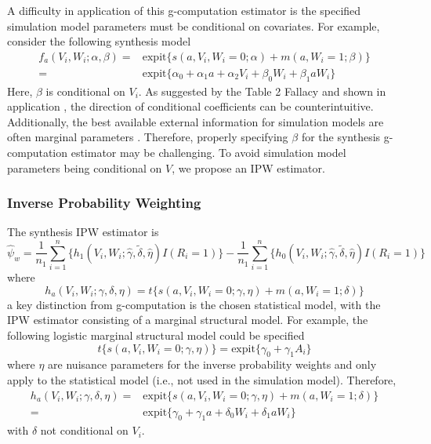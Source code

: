 \documentclass[]{article}
\begin{document}
A difficulty in application of this g-computation estimator is the specified simulation model parameters must be conditional on covariates. For example, consider the following synthesis model
\begin{equation*}
	\begin{aligned}
		f_a(V_i, W_i; \alpha, \beta) = & \text{expit}\{s(a,V_i, W_i=0;\alpha) + m(a,W_i=1;\beta)\} \\
		= & \text{expit}\{\alpha_0 + \alpha_1 a + \alpha_2 V_i + \beta_0 W_i + \beta_1 a W_i\}
	\end{aligned}
\end{equation*}
Here, $\beta$ is conditional on $V_i$. As suggested by the Table 2 Fallacy and shown in application \cite{westreich_table_2013, bandoli_revisiting_2018, williamson_factors_2020, westreich_comment_2021, keller_rates_2018}, the direction of conditional coefficients can be counterintuitive. Additionally, the best available external information for simulation models are often marginal parameters \cite{murray_comparison_2017, murray_challenges_2020}. Therefore, properly specifying $\beta$ for the synthesis g-computation estimator may be challenging. To avoid simulation model parameters being conditional on $V$, we propose an IPW estimator.

\subsubsection*{Inverse Probability Weighting}

The synthesis IPW estimator is
\[\hat{\psi}_w = \frac{1}{n_1} \sum_{i=1}^{n} 
\{h_1(V_i,W_i;\hat{\gamma}, \tilde{\delta}, \hat{\eta}) I(R_i = 1)\} - 
\frac{1}{n_1} \sum_{i=1}^{n} \{h_0(V_i,W_i;\hat{\gamma}, \tilde{\delta}, \hat{\eta}) I(R_i = 1)\}\]
where
\[h_a(V_i,W_i;\gamma, \delta, \eta) = t\{s(a,V_i,W_i=0;\gamma, \eta) + m(a,W_i=1;\delta)\}\]
a key distinction from g-computation is the chosen statistical model, with the IPW estimator consisting of a marginal structural model. For example, the following logistic marginal structural model could be specified
\[t\{s(a,V_i,W_i=0;\gamma, \eta)\} = \text{expit}\{\gamma_0 + \gamma_1 A_i\}\]
where $\eta$ are nuisance parameters for the inverse probability weights and only apply to the statistical model (i.e., not used in the simulation model). Therefore, 
\begin{equation*}
	\begin{aligned}
		h_a(V_i,W_i;\gamma, \delta, \eta) = & \text{expit}\{s(a,V_i,W_i=0;\gamma, \eta) + m(a,W_i=1;\delta)\} \\
		= & \text{expit}\{\gamma_0 + \gamma_1 a + \delta_0 W_i + \delta_1 a W_i\}
	\end{aligned}
\end{equation*}
with $\delta$ not conditional on $V_i$.
\end{document}
